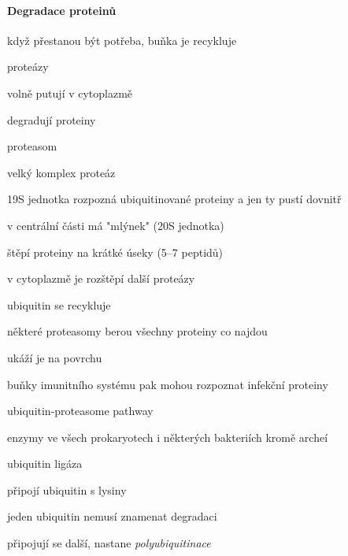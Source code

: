 \documentclass[DIV=8]{scrreprt}
\begin{document}
\paragraph{Degradace proteinů}
\begin{myItemize}[nosep]
    \item když přestanou být potřeba, buňka je recykluje
    \item proteázy
\begin{myItemize}[nosep]
    \item volně putují v cytoplazmě
    \item degradují proteiny
\end{myItemize}

    \item proteasom
\begin{myItemize}[nosep]
    \item velký komplex proteáz
    \item 19S jednotka rozpozná ubiquitinované proteiny a jen ty pustí dovnitř
    \item v centrální části má "mlýnek" (20S jednotka)
\begin{myItemize}[nosep]
    \item štěpí proteiny na krátké úseky (5--7 peptidů)
    \item v cytoplazmě je rozštěpí další proteázy
    \item ubiquitin se recykluje
\end{myItemize}

    \item některé proteasomy berou všechny proteiny co najdou
\begin{myItemize}[nosep]
    \item ukáží je na povrchu
    \item buňky imunitního systému pak mohou rozpoznat infekční proteiny
\end{myItemize}

\end{myItemize}

    \item ubiquitin-proteasome pathway
\begin{myItemize}[nosep]
    \item enzymy ve všech prokaryotech i některých bakteriích kromě archeí
    \item ubiquitin ligáza
\begin{myItemize}[nosep]
    \item připojí ubiquitin s lysiny
    \item jeden ubiquitin nemusí znamenat degradaci
\begin{myItemize}[nosep]
    \item připojují se další, nastane \emph{polyubiquitinace}
\end{myItemize}

\end{myItemize}

\end{myItemize}

\end{myItemize}
\end{document}
